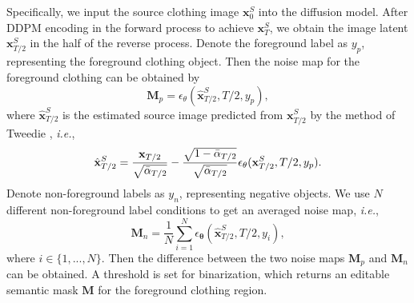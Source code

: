 Specifically, we input the source clothing image $\mathbf{x}^{S}_0$ into the diffusion model. 
After DDPM encoding in the forward process to achieve $\mathbf{x}^{S}_T$, we obtain the image latent $\mathbf{x}^{S}_{T/2}$ in the half of the reverse process. 
Denote the foreground label as $y_p$, representing the foreground clothing object. 
Then the noise map for the foreground clothing can be obtained by
\begin{equation}
\label{eq7}
    \boldsymbol{M}_{p} = \epsilon_\theta(\hat{\mathbf{x}}^{S}_{T/2},T/2,y_p),
\end{equation}
where $\hat{\mathbf{x}}^{S}_{T/2}$ is the estimated source image predicted from $\mathbf{x}^S_{T/2}$ by the method of Tweedie  \cite{kim2021noise2score}, \textit{i.e.},
\begin{equation}
    \hat{\mathbf{x}}^S_{T/2} = \frac{\mathbf{x}_{T/2}}{\sqrt{\Bar{\alpha}_{T/2}}} - \frac{\sqrt{1-\Bar{\alpha}_{T/2}}}{\sqrt{\Bar{\alpha}_{T/2}}}{ \epsilon}_\theta(\mathbf{x}^S_{T/2},T/2,y_p).
\label{eqadd1}
\end{equation}
Denote non-foreground labels as $y_n$, representing negative objects.
We use $N$ different non-foreground label conditions to get an averaged noise map, \textit{i.e.},
\begin{equation}
\label{eq8}
    \boldsymbol{M}_{n} = \frac{1}{N} \sum_{i=1}^N\epsilon_{\boldsymbol{\theta}}(\hat{\mathbf{x}}^{S}_{T/2},T/2,y_{i}),
\end{equation}
where $i \in \{1, ..., N\}$.
Then the difference between the two noise maps $\boldsymbol{M}_p$ and $\boldsymbol{M}_n$ can be obtained. A threshold is set for binarization, which returns an editable semantic mask $\boldsymbol{M}$ for the foreground clothing region.


